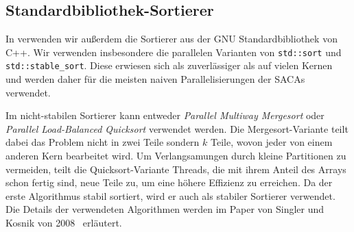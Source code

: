 \subsection{Standardbibliothek-Sortierer}
\label{section:stdsort}

In \sacabench verwenden wir außerdem die Sortierer aus der GNU Standardbibliothek von C++.
Wir verwenden insbesondere die parallelen Varianten von \texttt{std::sort}
und \texttt{std::stable\_sort}.
Diese erwiesen sich als zuverlässiger als \ipsviero auf vielen Kernen
und werden daher für die meisten naiven Parallelisierungen der SACAs verwendet.

Im nicht-stabilen Sortierer kann entweder \emph{Parallel Multiway Mergesort} oder \emph{Parallel Load-Balanced Quicksort} verwendet werden.
Die Mergesort-Variante teilt dabei das Problem nicht in zwei Teile sondern $k$ Teile, wovon jeder von einem anderen Kern bearbeitet wird.
Um Verlangsamungen durch kleine Partitionen zu vermeiden, teilt die Quicksort-Variante Threads,
die mit ihrem Anteil des Arrays schon fertig sind, neue Teile zu, um eine höhere Effizienz zu erreichen.
Da der erste Algorithmus stabil sortiert, wird er auch als stabiler Sortierer verwendet.
Die Details der verwendeten Algorithmen werden im Paper von Singler und Kosnik von 2008~\cite{parallelstdsort} erläutert.